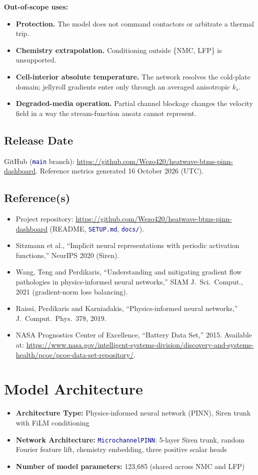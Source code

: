 \documentclass[10.5pt,a4paper]{article}
\newcommand{\code}[1]{\texttt{\textcolor{navy}{#1}}}
\begin{document}
\textbf{Out-of-scope uses:}
\begin{itemize}
  \item \textbf{Protection.} The model does not command contactors or arbitrate a thermal trip.
  \item \textbf{Chemistry extrapolation.} Conditioning outside \{NMC, LFP\} is unsupported.
  \item \textbf{Cell-interior absolute temperature.} The network resolves the cold-plate domain; jellyroll gradients enter only through an averaged anisotropic $k_s$.
  \item \textbf{Degraded-media operation.} Partial channel blockage changes the velocity field in a way the stream-function ansatz cannot represent.
\end{itemize}

\subsection*{Release Date}
GitHub (\code{main} branch): \url{https://github.com/Wezo420/heatwave-btms-pinn-dashboard}. Reference metrics generated 16 October 2026 (UTC).

\subsection*{Reference(s)}
\begin{itemize}
  \item Project repository: \url{https://github.com/Wezo420/heatwave-btms-pinn-dashboard} (README, \code{SETUP.md}, \code{docs/}).
  \item Sitzmann et al., ``Implicit neural representations with periodic activation functions,'' NeurIPS 2020 (Siren).
  \item Wang, Teng and Perdikaris, ``Understanding and mitigating gradient flow pathologies in physics-informed neural networks,'' SIAM J.\ Sci.\ Comput., 2021 (gradient-norm loss balancing).
  \item Raissi, Perdikaris and Karniadakis, ``Physics-informed neural networks,'' J.\ Comput.\ Phys.\ 378, 2019.
  \item NASA Prognostics Center of Excellence, ``Battery Data Set,'' 2015. Available at: \url{https://www.nasa.gov/intelligent-systems-division/discovery-and-systems-health/pcoe/pcoe-data-set-repository/}.
\end{itemize}

\section*{Model Architecture}
\begin{itemize}
  \item \textbf{Architecture Type:} Physics-informed neural network (PINN), Siren trunk with FiLM conditioning
  \item \textbf{Network Architecture:} \code{MicrochannelPINN}: 5-layer Siren trunk, random Fourier feature lift, chemistry embedding, three positive scalar heads
  \item \textbf{Number of model parameters:} 123,685 (shared across NMC and LFP)
\end{itemize}
\end{document}
